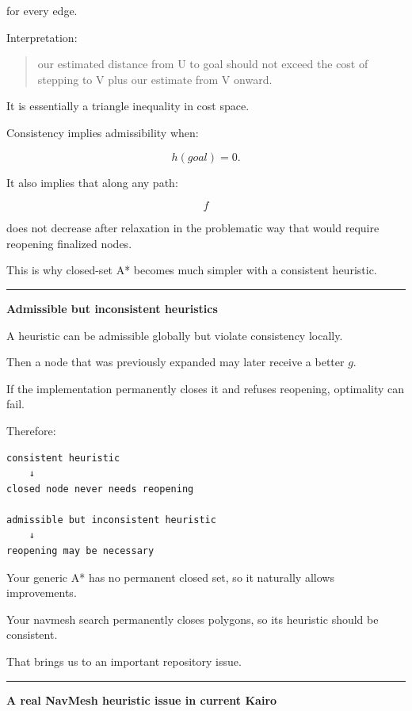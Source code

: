 for every edge.

Interpretation:

\begin{quote}
our estimated distance from U to goal should not exceed the cost of stepping to V plus our estimate from V onward.
\end{quote}

It is essentially a triangle inequality in cost space.

Consistency implies admissibility when:

\[
h(goal)=0.
\]

It also implies that along any path:

\[
f
\]

does not decrease after relaxation in the problematic way that would require reopening finalized nodes.

This is why closed-set A* becomes much simpler with a consistent heuristic.

\begin{center}\rule{0.5\linewidth}{0.5pt}\end{center}

\textbf{Admissible but inconsistent heuristics}

A heuristic can be admissible globally but violate consistency locally.

Then a node that was previously expanded may later receive a better \(g\).

If the implementation permanently closes it and refuses reopening, optimality can fail.

Therefore:

\begin{verbatim}
consistent heuristic
    ↓
closed node never needs reopening

admissible but inconsistent heuristic
    ↓
reopening may be necessary
\end{verbatim}

Your generic A* has no permanent closed set, so it naturally allows improvements.

Your navmesh search permanently closes polygons, so its heuristic should be consistent.

That brings us to an important repository issue.

\begin{center}\rule{0.5\linewidth}{0.5pt}\end{center}

\textbf{A real NavMesh heuristic issue in current Kairo}

